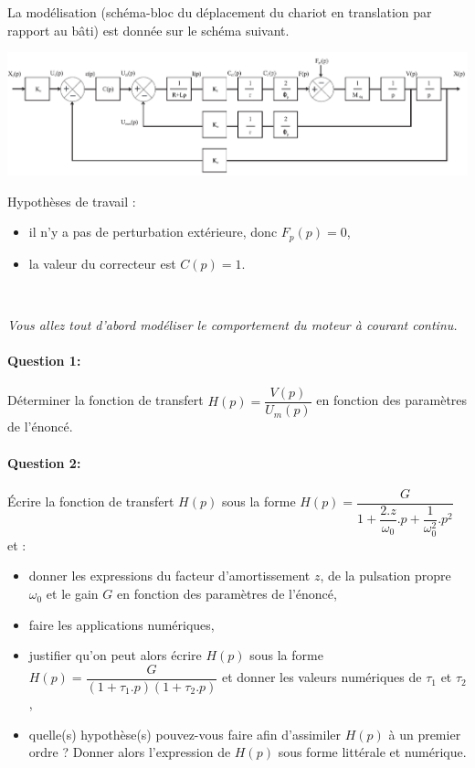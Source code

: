 La modélisation (schéma-bloc du déplacement du chariot en translation par rapport au bâti) est donnée sur le schéma suivant. 

\begin{center}
 \includegraphics[width=\linewidth]{img/img119}
\end{center}

\newpage 

Hypothèses de travail :
\begin{itemize}
 \item il n'y a pas de perturbation extérieure, donc $F_p(p)=0$,
 \item la valeur du correcteur est $C(p)=1$.
\end{itemize}

~\

\textit{Vous allez tout d'abord modéliser le comportement du moteur à courant continu.}

\paragraph{Question 1:} Déterminer la fonction de transfert $H(p)=\dfrac{V(p)}{U_m(p)}$ en fonction des paramètres de l'énoncé.

\paragraph{Question 2:} Écrire la fonction de transfert $H(p)$ sous la forme $H(p)=\dfrac{G}{1+\dfrac{2.z}{\omega_0}.p+\dfrac{1}{\omega_0^2}.p^2}$ et :
 \begin{itemize}
  \item donner les expressions du facteur d'amortissement $z$, de la pulsation propre $\omega_0$ et le gain $G$ en fonction des paramètres de l'énoncé,
  \item faire les applications numériques,
  \item justifier qu'on peut alors écrire $H(p)$ sous la forme $H(p)=\dfrac{G}{(1+\tau_1.p)(1+\tau_2.p)}$  et donner les valeurs numériques de $\tau_1$ et $\tau_2$,
  \item	quelle(s) hypothèse(s) pouvez-vous faire afin d'assimiler $H(p)$ à un premier ordre ? Donner alors l'expression de $H(p)$ sous forme littérale et numérique.
 \end{itemize}

